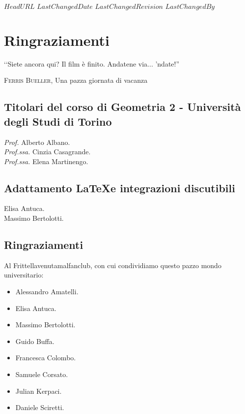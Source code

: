 \svnidlong
{$HeadURL$}
{$LastChangedDate$}
{$LastChangedRevision$}
{$LastChangedBy$}

\chapter{Ringraziamenti}

\begin{introduction}
  ‘‘Siete ancora qui? Il film è finito. Andatene via... 'ndate!''
	\begin{flushright}
		\textsc{Ferris Bueller,} Una pazza giornata di vacanza
	\end{flushright}
\end{introduction}

\section*{Titolari del corso di Geometria 2 - Università degli Studi di Torino}

\textit{Prof.} Alberto Albano.\\
\textit{Prof.ssa.} Cinzia Casagrande.\\
\textit{Prof.ssa.} Elena Martinengo.

\section*{Adattamento \LaTeX e integrazioni discutibili}
Elisa Antuca.\\
Massimo Bertolotti.

\section*{Ringraziamenti}
Al Frittellavenutamalfanclub, con cui condividiamo questo pazzo mondo universitario:
\begin{itemize}
	\item Alessandro Amatelli.
	\item Elisa Antuca.
	\item Massimo Bertolotti.
	\item Guido Buffa.
	\item Francesca Colombo.
	\item Samuele Corsato.
	\item Julian Kerpaci.
	\item Daniele Sciretti.
\end{itemize}